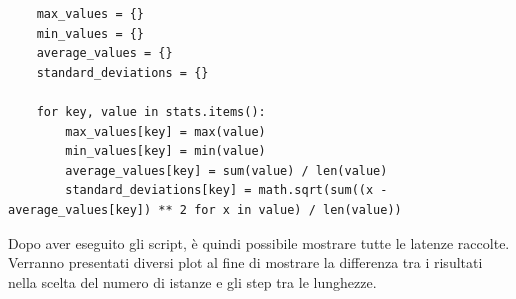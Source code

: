 \begin{lstlisting}
    max_values = {}
    min_values = {}
    average_values = {}
    standard_deviations = {}

    for key, value in stats.items():
        max_values[key] = max(value)
        min_values[key] = min(value)
        average_values[key] = sum(value) / len(value)
        standard_deviations[key] = math.sqrt(sum((x - average_values[key]) ** 2 for x in value) / len(value))
\end{lstlisting}

\noindent Dopo aver eseguito gli script, è quindi possibile mostrare tutte le latenze raccolte. Verranno presentati diversi plot al fine di mostrare la differenza tra i risultati nella scelta del numero di istanze e gli step tra le lunghezze. 




